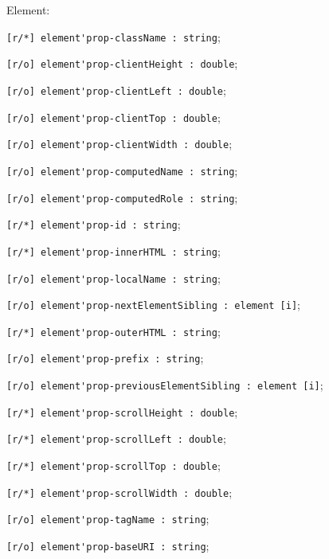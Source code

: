 \begin{icItems}
	\item Element:
	\begin{icItems}
		\item \lstinline|[r/*] element'prop-className : string|;
		\item \lstinline|[r/o] element'prop-clientHeight : double|;
		\item \lstinline|[r/o] element'prop-clientLeft : double|;
		\item \lstinline|[r/o] element'prop-clientTop : double|;
		\item \lstinline|[r/o] element'prop-clientWidth : double|;
		\item \lstinline|[r/o] element'prop-computedName : string|;
		\item \lstinline|[r/o] element'prop-computedRole : string|;
		\item \lstinline|[r/*] element'prop-id : string|;
		\item \lstinline|[r/*] element'prop-innerHTML : string|;
		\item \lstinline|[r/o] element'prop-localName : string|;
		\item \lstinline|[r/o] element'prop-nextElementSibling : element [i]|;
		\item \lstinline|[r/*] element'prop-outerHTML : string|;
		\item \lstinline|[r/o] element'prop-prefix : string|;
		\item \lstinline|[r/o] element'prop-previousElementSibling : element [i]|;
		\item \lstinline|[r/*] element'prop-scrollHeight : double|;
		\item \lstinline|[r/*] element'prop-scrollLeft : double|;
		\item \lstinline|[r/*] element'prop-scrollTop : double|;
		\item \lstinline|[r/*] element'prop-scrollWidth : double|;
		\item \lstinline|[r/o] element'prop-tagName : string|;
		\item \lstinline|[r/o] element'prop-baseURI : string|;
	\end{icItems}
	

\end{icItems}
